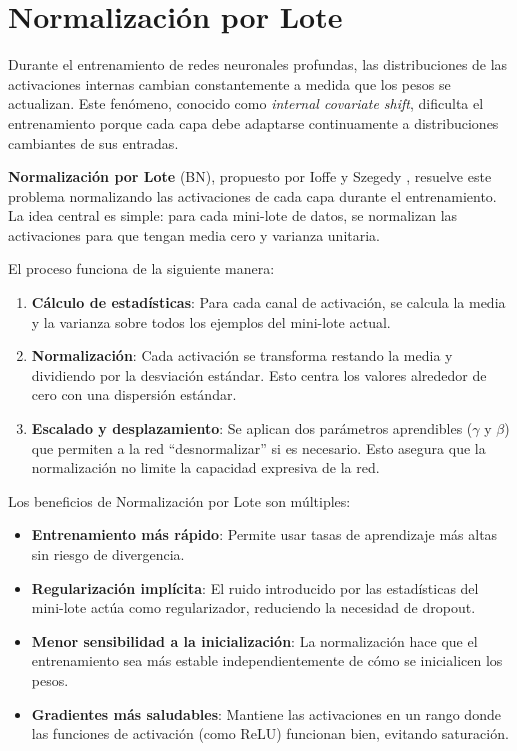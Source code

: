 \section{Normalización por Lote}
\label{sec:batch_norm}

Durante el entrenamiento de redes neuronales profundas, las distribuciones de las activaciones internas cambian constantemente a medida que los pesos se actualizan. Este fenómeno, conocido como \textit{internal covariate shift}, dificulta el entrenamiento porque cada capa debe adaptarse continuamente a distribuciones cambiantes de sus entradas.

\textbf{Normalización por Lote} (BN), propuesto por Ioffe y Szegedy \cite{ioffe2015batch}, resuelve este problema normalizando las activaciones de cada capa durante el entrenamiento. La idea central es simple: para cada mini-lote de datos, se normalizan las activaciones para que tengan media cero y varianza unitaria.

El proceso funciona de la siguiente manera:

\begin{enumerate}
    \item \textbf{Cálculo de estadísticas}: Para cada canal de activación, se calcula la media y la varianza sobre todos los ejemplos del mini-lote actual.

    \item \textbf{Normalización}: Cada activación se transforma restando la media y dividiendo por la desviación estándar. Esto centra los valores alrededor de cero con una dispersión estándar.

    \item \textbf{Escalado y desplazamiento}: Se aplican dos parámetros aprendibles ($\gamma$ y $\beta$) que permiten a la red ``desnormalizar'' si es necesario. Esto asegura que la normalización no limite la capacidad expresiva de la red.
\end{enumerate}

Los beneficios de Normalización por Lote son múltiples:

\begin{itemize}
    \item \textbf{Entrenamiento más rápido}: Permite usar tasas de aprendizaje más altas sin riesgo de divergencia.
    \item \textbf{Regularización implícita}: El ruido introducido por las estadísticas del mini-lote actúa como regularizador, reduciendo la necesidad de dropout.
    \item \textbf{Menor sensibilidad a la inicialización}: La normalización hace que el entrenamiento sea más estable independientemente de cómo se inicialicen los pesos.
    \item \textbf{Gradientes más saludables}: Mantiene las activaciones en un rango donde las funciones de activación (como ReLU) funcionan bien, evitando saturación.
\end{itemize}


